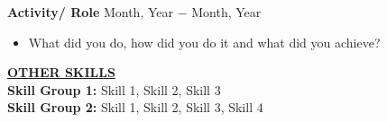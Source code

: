 \documentclass{article}
\begin{document}
\noindent \textbf{Activity/ Role} \hfill Month, Year $-$ Month, Year
\begin{itemize}[noitemsep,nolistsep,leftmargin=*]
\item {What did you do, how did you do it and what did you achieve? \\}
\end{itemize}

\noindent \textbf{\underline{OTHER SKILLS}} \\
\noindent \textbf{Skill Group 1:} Skill 1, Skill 2, Skill 3 \\
\noindent \textbf{Skill Group 2: } Skill 1, Skill 2, Skill 3, Skill 4
\end{document}
